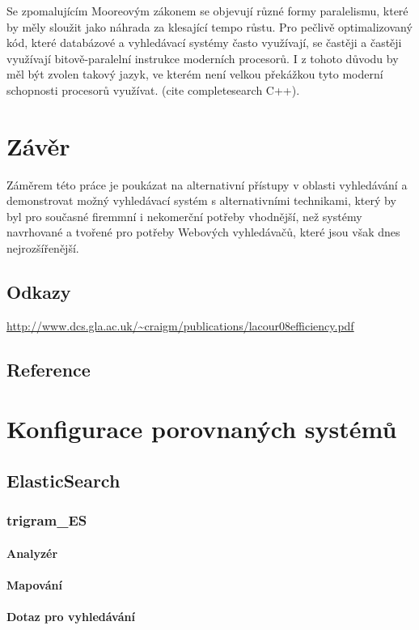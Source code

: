 \documentclass[11pt,letterpaper,oneside,openright]{book}
\begin{document}
Se zpomalujícím Mooreovým zákonem se objevují různé formy paralelismu, které by
měly sloužit jako náhrada za klesající tempo růstu. Pro pečlivě optimalizovaný
kód, které databázové a vyhledávací systémy často využívají, se častěji a
častěji využívají bitově-paralelní instrukce moderních procesorů. I z tohoto
důvodu by měl být zvolen takový jazyk, ve kterém není velkou překážkou tyto
moderní schopnosti procesorů využívat. (cite completesearch C++).


\chapter{Závěr}
Záměrem této práce je poukázat na alternativní přístupy v oblasti vyhledávání a
demonstrovat možný vyhledávací systém s alternativními technikami, který by byl
pro současné firemmní i nekomerční potřeby vhodnější, než systémy navrhované a
tvořené pro potřeby Webových vyhledávačů, které jsou však dnes nejrozšířenější.

\section*{Odkazy}
\url{http://www.dcs.gla.ac.uk/~craigm/publications/lacour08efficiency.pdf}

\newpage
\section*{Reference}



\appendix
\chapter{Konfigurace porovnaných systémů} \label{appendix:search_config}
\section{ElasticSearch}
\subsection{trigram\_ES}
\subsubsection{Analyzér}


\subsubsection{Mapování}


\subsubsection{Dotaz pro vyhledávání}



\backmatter
\end{document}
